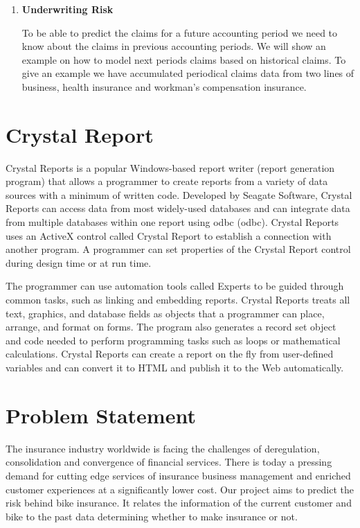 \begin{enumerate}
\item \textbf{Underwriting Risk}
\par
To be able to predict the claims for a future accounting period we need to know about the claims in previous accounting periods. We will show an example on how to model next periods claims based on historical claims. To give an example we have accumulated periodical claims data from two lines of business, health insurance and workman’s compensation insurance.

\end{enumerate}

\section{Crystal Report}
Crystal Reports is a popular Windows-based report writer (report generation program) that allows a programmer to create reports from a variety of data sources with a minimum of written code. Developed by Seagate Software, Crystal Reports can access data from most widely-used databases and can integrate data from multiple databases within one report using \acl{odbc} (\acs{odbc}). Crystal Reports uses an ActiveX control called Crystal Report to establish a connection with another program. A programmer can set properties of the Crystal Report control during design time or at run time.
\par
The programmer can use automation tools called Experts to be guided through common tasks, such as linking and embedding reports. Crystal Reports treats all text, graphics, and database fields as objects that a programmer can place, arrange, and format on forms. The program also generates a record set object and code needed to perform programming tasks such as loops or mathematical calculations. Crystal Reports can create a report on the fly from user-defined variables and can convert it to HTML and publish it to the Web automatically. 

\section{Problem Statement}
The insurance industry worldwide is facing the challenges of deregulation, consolidation and convergence of financial services. There is today a pressing demand for cutting edge services of insurance business management and enriched customer experiences at a significantly lower cost. Our project aims to predict the risk behind bike insurance. It relates the information of the current customer and bike to the past data determining whether to make insurance or not.

